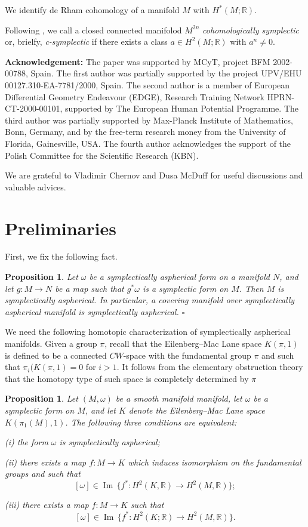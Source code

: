 \documentclass[12pt, twoside]{amsart}
\theoremstyle{plain}
\newtheorem{prop}[theorem]{Proposition}
\theoremstyle{definition}
\numberwithin{equation}{section}
\def\RR{\mathbb R}
\def\Im{\operatorname {Im}}
\def\hqed{\hfill\hfill$\square$}
\def\RR{\mathbb R}
\def\m{\medskip}
\begin{document}
\m  
We identify de Rham cohomology of a manifold $M$ with $H^*(M;\RR)$. 

Following \cite{LO}, we call a closed connected manifolod $M^{2n}$ {\it 
cohomologically symplectic} or, brielfy, {\it c-symplectic} if there exists a 
class $a\in H^2(M;\RR)$ with $a^n\ne 0$.

{\bf Acknowledgement:}  The paper was supported by MCyT, project BFM 2002-00788, 
Spain. The first author was partially supported by the project UPV/EHU
00127.310-EA-7781/2000, Spain. The second author is a member of European 
Differential Geometry Endeavour (EDGE), Research Training Network
HPRN-CT-2000-00101, supported by The European Human Potential Programme. The 
third author was partially supported by Max-Planck Institute of Mathematics, 
Bonn, Germany, and by the 
free-term research money from the University
of Florida,  Gainesville, USA. The fourth author 
acknowledges the support  of the Polish Committee for the Scientific Research 
(KBN).
 
We are grateful to Vladimir Chernov and Dusa McDuff for useful discussions and 
valuable advices.

\tableofcontents

\section{Preliminaries}
First,  we fix the following fact.

\begin{prop}
\label{induced}
Let $\omega$ be a symplectically aspherical form on a manifold $N$, and let 
$g: 
M \to N$ be a map such that $g^*\omega$ is a symplectic form on $M$. Then $M$ 
is 
symplectically aspherical. In particular, a covering manifold over 
symplectically aspherical manifold is symplectically 
aspherical.
\hqed
\end{prop}

\m We need the following homotopic characterization of symplectically
aspherical manifolds. Given a group $\pi$, recall that the Eilenberg--Mac Lane 
space $K(\pi,1)$ is defined to be a connected $CW$-space with the fundamental 
group $\pi$ and such that $\pi_i(K(\pi,1)=0$ for $i>1$. It follows from the 
elementary obstruction theory that the homotopy type of such space is completely 
determined by $\pi$ 

\begin{prop}  
\label{aspher}
Let $(M,\omega)$ be a smooth manifold manifold, let $\omega$ be a symplectic 
form on $M$, and let $K$ denote the Eilenberg--Mac Lane space $K(\pi_1(M),1)$. 
The following three
conditions are equivalent:
\par {\rm (i)} the form $\omega$ is symplectically aspherical; 

\par {\rm (ii)} there exists a map $f: M\to K$ which induces isomorphism on 
the
fundamental groups and such that 
% 
$$ 
[\omega]\in\Im\,\{f^*: H^2(K,\RR)\to H^2(M,\RR)\};
$$
\par {\rm (iii)} there exists a map $f: M\to K$ such that 
%
$$ 
[\omega]\in\Im\,\{f^*: H^2(K;\RR)\to H^2(M,\RR)\}.
$$
\end{prop}
\end{document}
